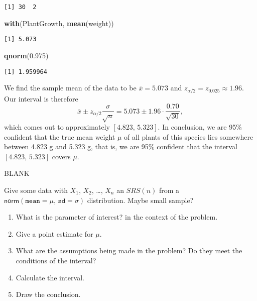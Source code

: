 \documentclass[]{book}
\newenvironment{Shaded}{\begin{snugshade}}{\end{snugshade}}
\newcommand{\KeywordTok}[1]{\textcolor[rgb]{0.13,0.29,0.53}{\textbf{{#1}}}}
\newcommand{\FloatTok}[1]{\textcolor[rgb]{0.00,0.00,0.81}{{#1}}}
\newcommand{\NormalTok}[1]{{#1}}
\providecommand{\tightlist}{%
  \setlength{\itemsep}{0pt}\setlength{\parskip}{0pt}}
\numberwithin{equation}{chapter}
\numberwithin{figure}{chapter}
\theoremstyle{plain}
\theoremstyle{definition}
\theoremstyle{remark}
\theoremstyle{definition}
\theoremstyle{definition}
\theoremstyle{remark}
\let\BeginKnitrBlock\begin \let\EndKnitrBlock\end
\begin{document}
\begin{verbatim}
[1] 30  2
\end{verbatim}

\begin{Shaded}
\begin{Highlighting}[]
\KeywordTok{with}\NormalTok{(PlantGrowth, }\KeywordTok{mean}\NormalTok{(weight))}
\end{Highlighting}
\end{Shaded}

\begin{verbatim}
[1] 5.073
\end{verbatim}

\begin{Shaded}
\begin{Highlighting}[]
\KeywordTok{qnorm}\NormalTok{(}\FloatTok{0.975}\NormalTok{)}
\end{Highlighting}
\end{Shaded}

\begin{verbatim}
[1] 1.959964
\end{verbatim}

We find the sample mean of the data to be \(\overline{x}=5.073\) and
\(z_{\alpha/2}=z_{0.025}\approx1.96\). Our interval is therefore \[
\overline{x}\pm
z_{\alpha/2}\frac{\sigma}{\sqrt{n}}=5.073\pm1.96\cdot\frac{0.70}{\sqrt{30}},
\] which comes out to approximately \([4.823,\,5.323]\). In conclusion,
we are 95\% confident that the true mean weight \(\mu\) of all plants of
this species lies somewhere between 4.823 g and 5.323 g, that is, we are
95\% confident that the interval \([4.823,\,5.323]\) covers \(\mu\).

BLANK

\bigskip

\BeginKnitrBlock{example}
\protect\hypertarget{ex:unnamed-chunk-397}{}{\label{ex:unnamed-chunk-397}}Give
some data with \(X_{1}\), \(X_{2}\), \ldots{}, \(X_{n}\) an \(SRS(n)\)
from a \(\mathsf{norm}(\mathtt{mean}=\mu,\,\mathtt{sd}=\sigma)\)
distribution. Maybe small sample?
\EndKnitrBlock{example}

\begin{enumerate}
\def\labelenumi{\arabic{enumi}.}
\tightlist
\item
  What is the parameter of interest? in the context of the problem.
\item
  Give a point estimate for \(\mu\).
\item
  What are the assumptions being made in the problem? Do they meet the
  conditions of the interval?
\item
  Calculate the interval.
\item
  Draw the conclusion.
\end{enumerate}
\end{document}
